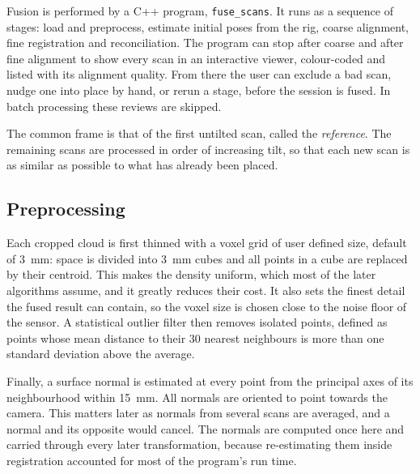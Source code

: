 
Fusion is performed by a C++ program, \texttt{fuse\_scans}. It runs as a sequence of stages: load and preprocess, estimate initial poses from the rig, coarse alignment, fine registration and reconciliation. The program can stop after coarse and after fine alignment to show every scan in an interactive viewer, colour-coded and listed with its alignment quality. From there the user can exclude a bad scan, nudge one into place by hand, or rerun a stage, before the session is fused. In batch processing these
reviews are skipped.

The common frame is that of the first untilted scan, called the \emph{reference}. The remaining scans are processed in order of increasing tilt, so that each new scan is as similar as possible to what has already been placed.

\subsection{Preprocessing}

Each cropped cloud is first thinned with a voxel grid of user defined size, default of 3~mm: space is divided into 3~mm cubes and all points in a cube are replaced by their centroid. This makes the density uniform, which most of the later algorithms assume, and it greatly reduces their cost. It also sets the finest detail the fused result can contain, so the voxel size is chosen close to the noise floor of the sensor. A statistical outlier filter then removes isolated points, defined as points whose mean distance to their 30 nearest neighbours is more than one standard deviation above the average.

Finally, a surface normal is estimated at every point from the principal axes of its neighbourhood within 15~mm. All normals are oriented to point towards the camera. This matters later as normals from several scans are averaged, and a normal and its opposite would cancel. The normals are computed once here and carried through every later transformation, because re-estimating them inside registration accounted for most of the program's run time.


